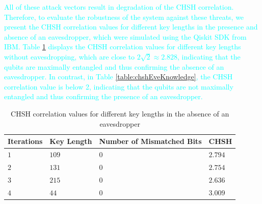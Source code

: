 \documentclass[a4paper]{cas-sc}
\begin{document}
\textcolor{cyan}{All of these attack vectors result in degradation of the CHSH correlation. Therefore, to evaluate the robustness of the system against these threats, we present the CHSH correlation values for different key lengths in the presence and absence of an eavesdropper, which were simulated using the Qiskit SDK from IBM. Table \ref{table:chsheRsults} displays the CHSH correlation values for different key lengths without eavesdropping, which are close to $2\sqrt{2} \approx 2.828$, indicating that the qubits are maximally entangled and thus confirming the absence of an eavesdropper. In contrast, in Table \ref{table:chshEveKnowledge}, the CHSH correlation value is below 2, indicating that the qubits are not maximally entangled and thus confirming the presence of an eavesdropper.}
\begin{table}[pos=h]
    \begin{center}
        \caption{CHSH correlation values for different key lengths in the absence of an eavesdropper}
        \begin{tabularx}{\textwidth}{>{\centering\arraybackslash}X>{\centering\arraybackslash}X>{\centering\arraybackslash}X>{\centering\arraybackslash}X}
            \hline
            Iterations & Key Length & Number of Mismatched Bits & CHSH    \\ \hline
            $1$        & $109$      & $0$                       & $2.794$ \\
            $2$        & $131$      & $0$                       & $2.754$ \\
            $3$        & $215$      & $0$                       & $2.636$ \\
            $4$        & $44$       & $0$                       & $3.009$ \\
            \hline
        \end{tabularx}
        \label{table:chsheRsults}
    \end{center}
\end{table}
\end{document}
